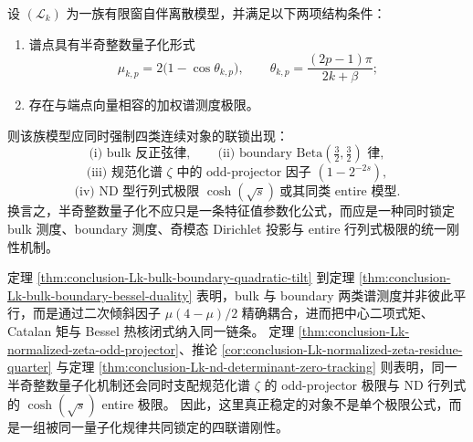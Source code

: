 \begin{conjecture}[半奇整数量子化的四联刚性]\label{conj:conclusion-halfodd-quantization-fourfold-rigidity}
设 \((\mathcal L_k)\) 为一族有限窗自伴离散模型，并满足以下两项结构条件：
\begin{enumerate}
\item 谱点具有半奇整数量子化形式
\[
\mu_{k,p}=2\bigl(1-\cos\theta_{k,p}\bigr),
\qquad
\theta_{k,p}=\frac{(2p-1)\pi}{2k+\beta};
\]
\item 存在与端点向量相容的加权谱测度极限。
\end{enumerate}
则该族模型应同时强制四类连续对象的联锁出现：
\[
\text{(i) bulk 反正弦律},\qquad
\text{(ii) boundary }\mathrm{Beta}\!\left(\tfrac32,\tfrac32\right)\text{ 律},
\]
\[
\text{(iii) 规范化谱 \(\zeta\) 中的 odd-projector 因子 }(1-2^{-2s}),
\]
\[
\text{(iv) ND 型行列式极限 }\cosh(\sqrt{s})\ \text{或其同类 entire 模型}.
\]
换言之，半奇整数量子化不应只是一条特征值参数化公式，而应是一种同时锁定 bulk 测度、boundary 测度、奇模态 Dirichlet 投影与 entire 行列式极限的统一刚性机制。
\end{conjecture}

\begin{remark}[统一读法]\label{rem:conclusion-halfodd-laplacian-bulkboundary-bessel-oddprojector-cosh}
定理 \ref{thm:conclusion-Lk-bulk-boundary-quadratic-tilt} 到定理 \ref{thm:conclusion-Lk-bulk-boundary-bessel-duality} 表明，bulk 与 boundary 两类谱测度并非彼此平行，而是通过二次倾斜因子 \(\mu(4-\mu)/2\) 精确耦合，进而把中心二项式矩、Catalan 矩与 Bessel 热核闭式纳入同一链条。
定理 \ref{thm:conclusion-Lk-normalized-zeta-odd-projector}、推论 \ref{cor:conclusion-Lk-normalized-zeta-residue-quarter} 与定理 \ref{thm:conclusion-Lk-nd-determinant-zero-tracking} 则表明，同一半奇整数量子化机制还会同时支配规范化谱 \(\zeta\) 的 odd-projector 极限与 ND 行列式的 \(\cosh(\sqrt{s})\) entire 极限。
因此，这里真正稳定的对象不是单个极限公式，而是一组被同一量子化规律共同锁定的四联谱刚性。
\end{remark}

\endinput
